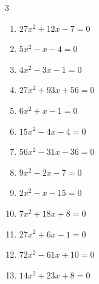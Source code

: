 \begin{multicols}{3}
\begin{enumerate}
  \item $27x^{2}+12x-7=0$


  \item $5x^{2}-x-4=0$


  \item $4x^{2}-3x-1=0$


  \item $27x^{2}+93x+56=0$


  \item $6x^{2}+x-1=0$


  \item $15x^{2}-4x-4=0$


  \item $56x^{2}-31x-36=0$


  \item $9x^{2}-2x-7=0$


\columnbreak %

\resetques

  \item $2x^{2}-x-15=0$


  \item $7x^{2}+18x+8=0$


  \item $27x^{2}+6x-1=0$


  \item $72x^{2}-61x+10=0$


  \item $14x^{2}+23x+8=0$


\end{enumerate}
\end{multicols}
